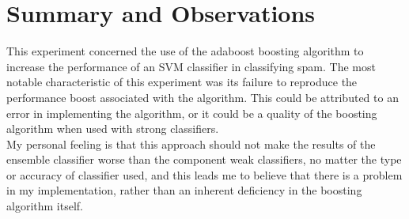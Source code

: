 \documentclass[titlepage,11pt]{article}
\begin{document}
\section[7]{Summary and Observations} {
\vspace{2pt} \hspace{2pt}This experiment concerned the use of the adaboost boosting algorithm to increase the performance of an SVM classifier in classifying spam. The most notable characteristic of this experiment was its failure to reproduce the performance boost associated with the algorithm. This could be attributed to an error in implementing the algorithm, or it could be a quality of the boosting algorithm when used with strong classifiers.\\
\vspace{2pt} \hspace{2pt}My personal feeling is that this approach should not make the results of the ensemble classifier worse than the component weak classifiers, no matter the type or accuracy of classifier used, and this leads me to believe that there is a problem in my implementation, rather than an inherent deficiency in the boosting algorithm itself.
}
\end{document}
